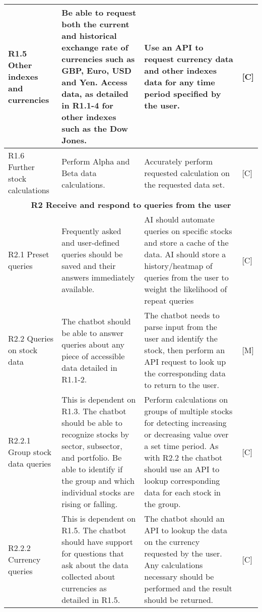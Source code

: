\documentclass{IEEEtran}
\begin{document}
\begin{center}
\begin{longtable}{ | m{3cm} | m{7cm} | m{7cm} | m{0.5cm} | }
 		\hline
 		
		R1.5 Other indexes and currencies  & 
		Be able to request both the current and historical exchange rate of currencies such as GBP, Euro, USD and Yen. Access data, as detailed in R1.1-4 for other indexes such as the Dow Jones. &
		Use an API to request currency data and other indexes data for any time period specified by the user. & 
		[C] \\

		\hline
		
		R1.6 Further stock calculations & 
		Perform Alpha and Beta data calculations. & 
		Accurately perform requested calculation on the requested data set. & 
		[C] \\

		\hline

		\multicolumn{4}{|c|}{\textbf{R2 Receive and respond to queries from the user}} \\
	
		\hline
	
		R2.1 Preset queries  & 
		Frequently asked and user-defined queries should be saved and their answers immediately available. &
		AI should automate queries on specific stocks and store a cache of the data. AI should store a history/heatmap of queries from the user to weight the likelihood of repeat queries & 
		[C] \\
	
		\hline
	
		R2.2 Queries on stock data & 
		The chatbot should be able to answer queries about any piece of accessible data detailed in R1.1-2. & 
		The chatbot needs to parse input from the user and identify the stock, then perform an API request to look up the corresponding data to return to the user. & 
		[M] \\
		
		\hline
		
		R2.2.1 Group stock data queries & 
		This is dependent on R1.3. The chatbot should be able to recognize stocks by sector, subsector, and portfolio. Be able to identify if the group and which individual stocks are rising or falling. &
		Perform calculations on groups of multiple stocks for detecting increasing or decreasing value over a set time period. As with R2.2 the chatbot should use an API to lookup corresponding data for each stock in the group. & 
		[C] \\
		
		\hline

		R2.2.2 Currency queries & 
		This is dependent on R1.5. The chatbot should have support for questions that ask about the data collected about currencies as detailed in R1.5. & 
		The chatbot should an API to lookup the data on the currency requested by the user. Any calculations necessary should be performed and the result should be returned. &
		[C] \\
		

\end{longtable}
\end{center}
\end{document}
